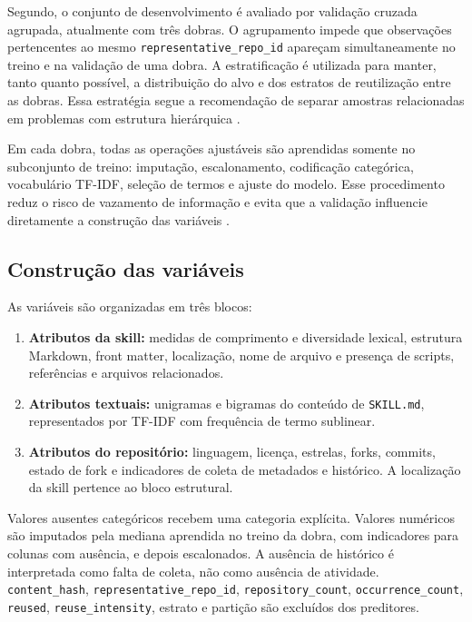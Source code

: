 Segundo, o conjunto de desenvolvimento é avaliado por validação cruzada
agrupada, atualmente com três dobras. O agrupamento impede que
observações pertencentes ao mesmo \texttt{representative\_repo\_id}
apareçam simultaneamente no treino e na validação de uma dobra. A
estratificação é utilizada para manter, tanto quanto possível, a
distribuição do alvo e dos estratos de reutilização entre as dobras.
Essa estratégia segue a recomendação de separar amostras relacionadas em
problemas com estrutura hierárquica
\cite{saeb2017need,roberts2017cross}.

Em cada dobra, todas as operações ajustáveis são aprendidas somente no
subconjunto de treino: imputação, escalonamento, codificação categórica,
vocabulário TF-IDF, seleção de termos e ajuste do modelo. Esse
procedimento reduz o risco de vazamento de informação e evita que a
validação influencie diretamente a construção das variáveis
\cite{kaufman2012leakage}.

\subsection{Construção das
variáveis}\label{construuxe7uxe3o-das-variuxe1veis}

As variáveis são organizadas em três blocos:

\begin{enumerate}
\def\labelenumi{\arabic{enumi}.}
\tightlist
\item
  \textbf{Atributos da skill:} medidas de comprimento e diversidade
  lexical, estrutura Markdown, front matter, localização, nome de
  arquivo e presença de scripts, referências e arquivos relacionados.
\item
  \textbf{Atributos textuais:} unigramas e bigramas do conteúdo de
  \texttt{SKILL.md}, representados por TF-IDF com frequência de termo
  sublinear.
\item
  \textbf{Atributos do repositório:} linguagem, licença, estrelas,
  forks, commits, estado de fork e indicadores de coleta de metadados e
  histórico. A localização da skill pertence ao bloco estrutural.
\end{enumerate}

Valores ausentes categóricos recebem uma categoria explícita. Valores
numéricos são imputados pela mediana aprendida no treino da dobra, com
indicadores para colunas com ausência, e depois escalonados. A ausência
de histórico é interpretada como falta de coleta, não como ausência de
atividade. \texttt{content\_hash}, \texttt{representative\_repo\_id},
\texttt{repository\_count}, \texttt{occurrence\_count}, \texttt{reused},
\texttt{reuse\_intensity}, estrato e partição são excluídos dos
preditores.

